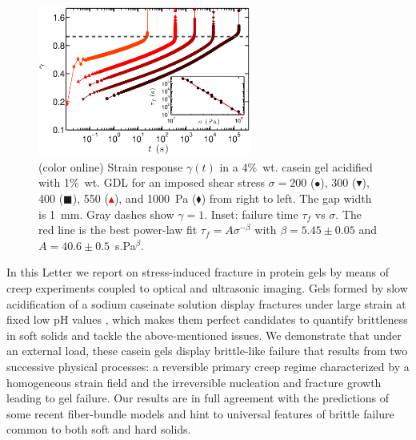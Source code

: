 \documentclass[twocolumn,superscriptaddress,showpacs,preprintnumbers,amsmath,amssymb,prl]{revtex4}
\begin{document}
\begin{figure}
\centering
\includegraphics[width=7cm]{Fig1.eps}
\caption{(color online) Strain response $\gamma(t)$ in a 4\%~wt. casein gel acidified with 1\%~wt. GDL for an imposed shear stress $\sigma=200$ (\textcolor{red!25!black}{$\bullet$}), 300 (\textcolor{red!50!black}{$\blacktriangledown$}), 400 (\textcolor{red!75!black}{$\blacksquare$}), 550 (\textcolor{red}{$\blacktriangle$}), and 1000~Pa (\textcolor{orange!50!red}{$\blacklozenge$}) from right to left. The gap width is 1~mm. Gray dashes show $\gamma=1$. Inset: failure time $\tau_f$ vs $\sigma$. The red line is the best power-law fit $\tau_f=A\sigma^{-\beta}$ with $\beta=5.45\pm 0.05$ and $A=40.6\pm 0.5$~s.Pa$^\beta$.
\label{fig1}}
\end{figure} 

In this Letter we report on stress-induced fracture in protein gels by means of creep experiments coupled to optical and ultrasonic imaging. Gels formed by slow acidification of a sodium caseinate solution \cite{Lucey:1998} display fractures under large strain at fixed low pH values \cite{vanVliet:1995}, which makes them perfect candidates to quantify brittleness in soft solids and tackle the above-mentioned issues. We demonstrate that under an external load, these casein gels display brittle-like failure that results from two successive physical processes: a reversible primary creep regime characterized by a homogeneous strain field and the irreversible nucleation and fracture growth leading to gel failure. Our results are in full agreement with the predictions of some recent fiber-bundle models and hint to universal features of brittle failure common to both soft and hard solids.
\end{document}
